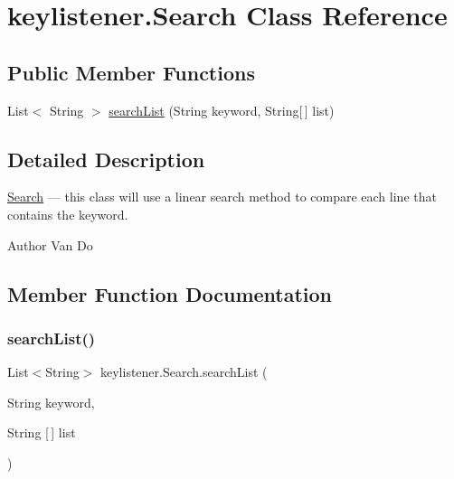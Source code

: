 \hypertarget{classkeylistener_1_1_search}{}\section{keylistener.\+Search Class Reference}
\label{classkeylistener_1_1_search}
\subsection*{Public Member Functions}
\begin{DoxyCompactItemize}
\item 
List$<$ String $>$ \hyperlink{classkeylistener_1_1_search_aca84b495ee4365467104d2431d2fd974}{search\+List} (String keyword, String\mbox{[}$\,$\mbox{]} list)
\end{DoxyCompactItemize}


\subsection{Detailed Description}
\hyperlink{classkeylistener_1_1_search}{Search} --- this class will use a linear search method to compare each line that contains the keyword. \begin{DoxyAuthor}{Author}
Van Do 
\end{DoxyAuthor}


\subsection{Member Function Documentation}
\mbox{\label{classkeylistener_1_1_search_aca84b495ee4365467104d2431d2fd974}} 
\subsubsection{\texorpdfstring{search\+List()}{searchList()}}
{\footnotesize\ttfamily List$<$String$>$ keylistener.\+Search.\+search\+List (\begin{DoxyParamCaption}\item[{String}]{keyword,  }\item[{String \mbox{[}$\,$\mbox{]}}]{list }\end{DoxyParamCaption})\hspace{0.3cm}{\ttfamily [inline]}}

